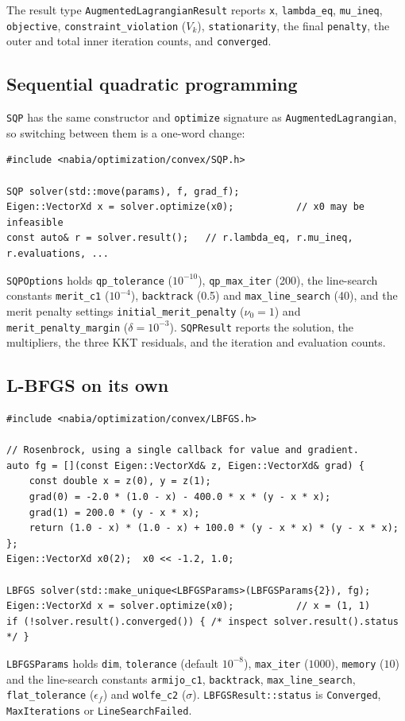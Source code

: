 The result type \texttt{AugmentedLagrangianResult} reports \texttt{x},
\texttt{lambda\_eq}, \texttt{mu\_ineq}, \texttt{objective},
\texttt{constraint\_violation} ($V_k$),
\texttt{stationarity}, the final \texttt{penalty}, the outer and total inner
iteration counts, and \texttt{converged}.

\subsection{Sequential quadratic programming}
\texttt{SQP} has the same constructor and
\texttt{optimize} signature as \texttt{AugmentedLagrangian}, so switching
between them is a one-word change:
\begin{lstlisting}
#include <nabia/optimization/convex/SQP.h>

SQP solver(std::move(params), f, grad_f);
Eigen::VectorXd x = solver.optimize(x0);           // x0 may be infeasible
const auto& r = solver.result();   // r.lambda_eq, r.mu_ineq, r.evaluations, ...
\end{lstlisting}
\texttt{SQPOptions} holds \texttt{qp\_tolerance} ($10^{-10}$), \texttt{qp\_max\_iter} (200),
the line-search constants \texttt{merit\_c1} ($10^{-4}$), \texttt{backtrack} (0.5) and
\texttt{max\_line\_search} (40), and the merit penalty settings \texttt{initial\_merit\_penalty} ($\nu_0=1$) and
\texttt{merit\_penalty\_margin} ($\delta=10^{-3}$). \texttt{SQPResult} reports the solution,
the multipliers, the three KKT residuals, and the iteration and evaluation counts.

\subsection{L-BFGS on its own}
\begin{lstlisting}
#include <nabia/optimization/convex/LBFGS.h>

// Rosenbrock, using a single callback for value and gradient.
auto fg = [](const Eigen::VectorXd& z, Eigen::VectorXd& grad) {
    const double x = z(0), y = z(1);
    grad(0) = -2.0 * (1.0 - x) - 400.0 * x * (y - x * x);
    grad(1) = 200.0 * (y - x * x);
    return (1.0 - x) * (1.0 - x) + 100.0 * (y - x * x) * (y - x * x);
};
Eigen::VectorXd x0(2);  x0 << -1.2, 1.0;

LBFGS solver(std::make_unique<LBFGSParams>(LBFGSParams{2}), fg);
Eigen::VectorXd x = solver.optimize(x0);           // x = (1, 1)
if (!solver.result().converged()) { /* inspect solver.result().status */ }
\end{lstlisting}
\texttt{LBFGSParams} holds \texttt{dim}, \texttt{tolerance} (default
$10^{-8}$), \texttt{max\_iter} ($1000$), \texttt{memory} ($10$) and the line-search
constants \texttt{armijo\_c1}, \texttt{backtrack}, \texttt{max\_line\_search}, \texttt{flat\_tolerance}
($\epsilon_f$) and \texttt{wolfe\_c2} ($\sigma$).
\texttt{LBFGSResult::status} is \texttt{Converged}, \texttt{MaxIterations} or
\texttt{LineSearchFailed}.

